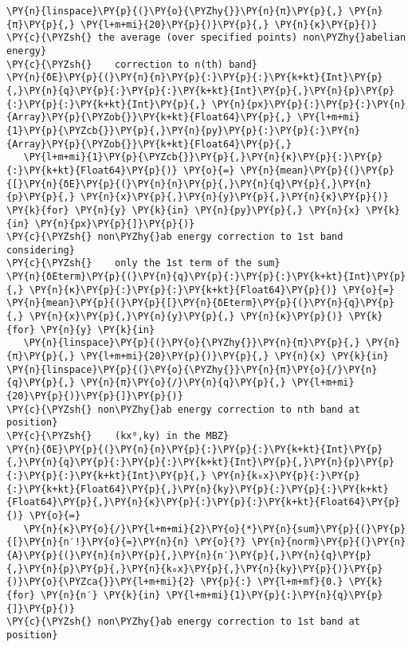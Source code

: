\begin{Verbatim}[commandchars=\\\{\}]
   \PY{n}{linspace}\PY{p}{(}\PY{o}{\PYZhy{}}\PY{n}{π}\PY{p}{,} \PY{n}{π}\PY{p}{,} \PY{l+m+mi}{20}\PY{p}{)}\PY{p}{,} \PY{n}{κ}\PY{p}{)}
\PY{c}{\PYZsh{} the average (over specified points) non\PYZhy{}abelian energy}
\PY{c}{\PYZsh{}    correction to n(th) band}
\PY{n}{δE}\PY{p}{(}\PY{n}{n}\PY{p}{:}\PY{p}{:}\PY{k+kt}{Int}\PY{p}{,}\PY{n}{q}\PY{p}{:}\PY{p}{:}\PY{k+kt}{Int}\PY{p}{,}\PY{n}{p}\PY{p}{:}\PY{p}{:}\PY{k+kt}{Int}\PY{p}{,} \PY{n}{px}\PY{p}{:}\PY{p}{:}\PY{n}{Array}\PY{p}{\PYZob{}}\PY{k+kt}{Float64}\PY{p}{,} \PY{l+m+mi}{1}\PY{p}{\PYZcb{}}\PY{p}{,}\PY{n}{py}\PY{p}{:}\PY{p}{:}\PY{n}{Array}\PY{p}{\PYZob{}}\PY{k+kt}{Float64}\PY{p}{,}
   \PY{l+m+mi}{1}\PY{p}{\PYZcb{}}\PY{p}{,}\PY{n}{κ}\PY{p}{:}\PY{p}{:}\PY{k+kt}{Float64}\PY{p}{)} \PY{o}{=} \PY{n}{mean}\PY{p}{(}\PY{p}{[}\PY{n}{δE}\PY{p}{(}\PY{n}{n}\PY{p}{,}\PY{n}{q}\PY{p}{,}\PY{n}{p}\PY{p}{,} \PY{n}{x}\PY{p}{,}\PY{n}{y}\PY{p}{,}\PY{n}{κ}\PY{p}{)} \PY{k}{for} \PY{n}{y} \PY{k}{in} \PY{n}{py}\PY{p}{,} \PY{n}{x} \PY{k}{in} \PY{n}{px}\PY{p}{]}\PY{p}{)}
\PY{c}{\PYZsh{} non\PYZhy{}ab energy correction to 1st band considering}
\PY{c}{\PYZsh{}    only the 1st term of the sum}
\PY{n}{δEterm}\PY{p}{(}\PY{n}{q}\PY{p}{:}\PY{p}{:}\PY{k+kt}{Int}\PY{p}{,} \PY{n}{κ}\PY{p}{:}\PY{p}{:}\PY{k+kt}{Float64}\PY{p}{)} \PY{o}{=} \PY{n}{mean}\PY{p}{(}\PY{p}{[}\PY{n}{δEterm}\PY{p}{(}\PY{n}{q}\PY{p}{,} \PY{n}{x}\PY{p}{,}\PY{n}{y}\PY{p}{,} \PY{n}{κ}\PY{p}{)} \PY{k}{for} \PY{n}{y} \PY{k}{in}
   \PY{n}{linspace}\PY{p}{(}\PY{o}{\PYZhy{}}\PY{n}{π}\PY{p}{,} \PY{n}{π}\PY{p}{,} \PY{l+m+mi}{20}\PY{p}{)}\PY{p}{,} \PY{n}{x} \PY{k}{in} \PY{n}{linspace}\PY{p}{(}\PY{o}{\PYZhy{}}\PY{n}{π}\PY{o}{/}\PY{n}{q}\PY{p}{,} \PY{n}{π}\PY{o}{/}\PY{n}{q}\PY{p}{,} \PY{l+m+mi}{20}\PY{p}{)}\PY{p}{]}\PY{p}{)}
\PY{c}{\PYZsh{} non\PYZhy{}ab energy correction to nth band at position}
\PY{c}{\PYZsh{}    (kx⁰,ky) in the MBZ}
\PY{n}{δE}\PY{p}{(}\PY{n}{n}\PY{p}{:}\PY{p}{:}\PY{k+kt}{Int}\PY{p}{,}\PY{n}{q}\PY{p}{:}\PY{p}{:}\PY{k+kt}{Int}\PY{p}{,}\PY{n}{p}\PY{p}{:}\PY{p}{:}\PY{k+kt}{Int}\PY{p}{,} \PY{n}{k₀x}\PY{p}{:}\PY{p}{:}\PY{k+kt}{Float64}\PY{p}{,}\PY{n}{ky}\PY{p}{:}\PY{p}{:}\PY{k+kt}{Float64}\PY{p}{,}\PY{n}{κ}\PY{p}{:}\PY{p}{:}\PY{k+kt}{Float64}\PY{p}{)} \PY{o}{=}
   \PY{n}{κ}\PY{o}{/}\PY{l+m+mi}{2}\PY{o}{*}\PY{n}{sum}\PY{p}{(}\PY{p}{[}\PY{n}{n′!}\PY{o}{=}\PY{n}{n} \PY{o}{?} \PY{n}{norm}\PY{p}{(}\PY{n}{A}\PY{p}{(}\PY{n}{n}\PY{p}{,}\PY{n}{n′}\PY{p}{,}\PY{n}{q}\PY{p}{,}\PY{n}{p}\PY{p}{,}\PY{n}{k₀x}\PY{p}{,}\PY{n}{ky}\PY{p}{)}\PY{p}{)}\PY{o}{\PYZca{}}\PY{l+m+mi}{2} \PY{p}{:} \PY{l+m+mf}{0.} \PY{k}{for} \PY{n}{n′} \PY{k}{in} \PY{l+m+mi}{1}\PY{p}{:}\PY{n}{q}\PY{p}{]}\PY{p}{)}
\PY{c}{\PYZsh{} non\PYZhy{}ab energy correction to 1st band at position}

\end{Verbatim}
